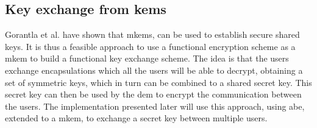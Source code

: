 \subsection{Key exchange from \glspl{kem}}\label{subsec:ke-kem}
Gorantla et al. \cite{kem-group-ke} have shown that m\Glspl{kem}, can be used to establish secure shared keys. It is thus a feasible approach to use a functional encryption scheme as a m\Gls{kem} to build a functional key exchange scheme. The idea is that the users exchange encapsulations which all the users will be able to decrypt, obtaining a set of symmetric keys, which in turn can be combined to a shared secret key. This secret key can then be used by the \gls{dem} to encrypt the communication between the users. The implementation presented later will use this approach, using \gls{abe}, extended to a m\Gls{kem}, to exchange a secret key between multiple users.







